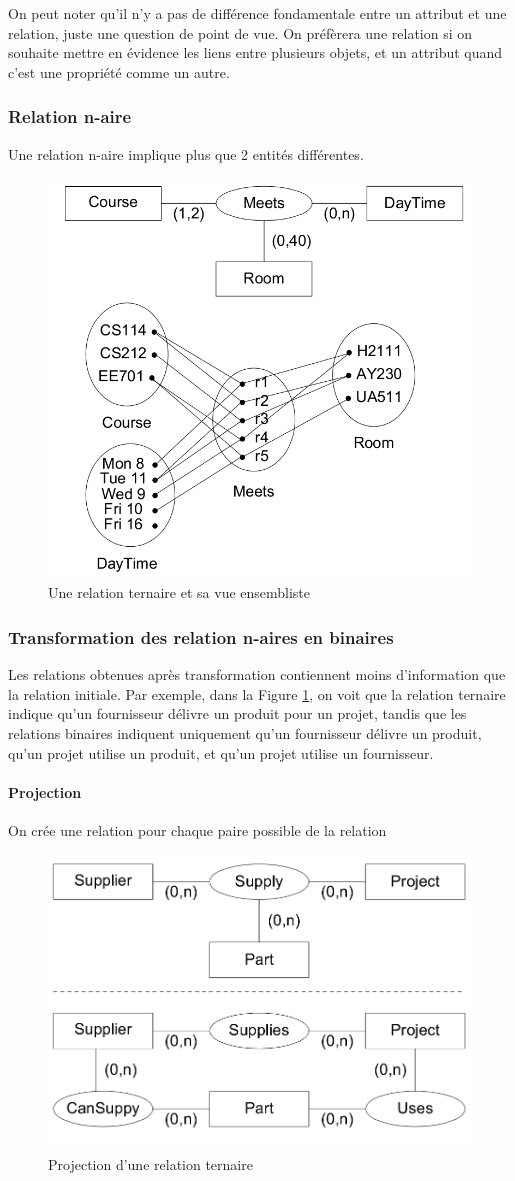\documentclass[a4paper]{article}
\begin{document}
On peut noter qu'il n'y a pas de différence fondamentale entre un attribut et une relation,
juste une question de point de vue. On préfèrera une relation si on souhaite mettre en évidence
les liens entre plusieurs objets, et un attribut quand c'est une propriété comme un autre.

\subsubsection{Relation n-aire}
Une relation n-aire implique plus que 2 entités différentes.

\begin{figure}[H]
    \center
    \includegraphics[width=.4\textwidth]{fig/relation-naire.png}
    \caption{Une relation ternaire et sa vue ensembliste}
\end{figure}

\subsubsection{Transformation des relation n-aires en binaires}
Les relations obtenues après transformation contiennent moins d'information
que la relation initiale. Par exemple, dans la Figure \ref{fig:relation-naire-projection},
on voit que la relation ternaire indique qu'un fournisseur délivre un produit pour un projet,
tandis que les relations binaires indiquent uniquement qu'un fournisseur délivre un produit,
qu'un projet utilise un produit, et qu'un projet utilise un fournisseur.

\paragraph{Projection}
On crée une relation pour chaque paire possible de la relation
\begin{figure}[H]
    \center
    \includegraphics[width=.4\textwidth]{fig/relation-naire-projection.png}
    \caption{\label{fig:relation-naire-projection}Projection d'une relation ternaire}
\end{figure}
\end{document}
